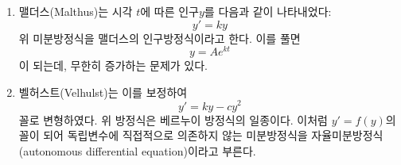 \documentclass[../engineering_mathematics_lecture_note.tex]{subfiles}
\begin{document}
\begin{definition}
    \begin{enumerate}
        \item 맬더스(Malthus)는 시각 $t$에 따른 인구$y$를 다음과 같이 나타내었다:
            \begin{equation*}
                y' = ky
            \end{equation*}
            위 미분방정식을 맬더스의 인구방정식이라고 한다.
            이를 풀면
            \begin{equation*}
                y = A e^{kt}
            \end{equation*}
            이 되는데, 무한히 증가하는 문제가 있다.
        \item 벨허스트(Velhulst)는 이를 보정하여
            \begin{equation*}
                y' = ky - cy^2
            \end{equation*}
            꼴로 변형하였다.
            위 방정식은 베르누이 방정식의 일종이다.
            이처럼 $y' = f(y)$의 꼴이 되어 독립변수에 직접적으로 의존하지 않는 미분방정식을 자율미분방정식(autonomous differential equation)이라고 부른다.
    \end{enumerate}
\end{definition}
\end{document}
